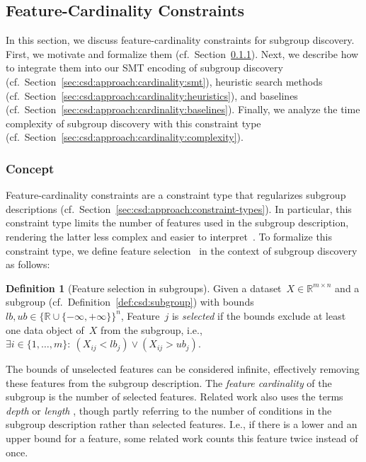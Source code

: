 \documentclass{article}
\theoremstyle{definition}
\newtheorem{definition}{Definition}
\begin{document}
\subsection{Feature-Cardinality Constraints}
\label{sec:csd:approach:cardinality}

In this section, we discuss feature-cardinality constraints for subgroup discovery.
First, we motivate and formalize them (cf.~Section~\ref{sec:csd:approach:cardinality:concept}).
Next, we describe how to integrate them into our SMT encoding of subgroup discovery (cf.~Section~\ref{sec:csd:approach:cardinality:smt}), heuristic search methods (cf.~Section~\ref{sec:csd:approach:cardinality:heuristics}), and baselines (cf.~Section~\ref{sec:csd:approach:cardinality:baselines}).
Finally, we analyze the time complexity of subgroup discovery with this constraint type (cf.~Section~\ref{sec:csd:approach:cardinality:complexity}).

\subsubsection{Concept}
\label{sec:csd:approach:cardinality:concept}

Feature-cardinality constraints are a constraint type that regularizes subgroup descriptions (cf.~Section~\ref{sec:csd:approach:constraint-types}).
In particular, this constraint type limits the number of features used in the subgroup description, rendering the latter less complex and easier to interpret~\cite{meeng2021real}.
To formalize this constraint type, we define feature selection~\cite{guyon2003introduction, li2017feature} in the context of subgroup discovery as follows:
%
\begin{definition}[Feature selection in subgroups]
	Given a dataset~$X \in \mathbb{R}^{m \times n}$ and a subgroup (cf.~Definition~\ref{def:csd:subgroup}) with bounds~$\mathit{lb}, \mathit{ub} \in \{\mathbb{R} \cup \{-\infty, +\infty\}\}^n$,
	Feature~$j$ is \emph{selected} if the bounds exclude at least one data object of~$X$ from the subgroup, i.e., $\exists i \in \{1, \dots, m\}:~ \left( X_{ij} < \mathit{lb}_j \right) \lor \left( X_{ij} > \mathit{ub}_j \right)$.
	\label{def:csd:feature-selection}
\end{definition}
%
The bounds of unselected features can be considered infinite, effectively removing these features from the subgroup description.
The \emph{feature cardinality} of the subgroup is the number of selected features.
Related work also uses the terms \emph{depth} \cite{meeng2021real} or \emph{length} \cite{atzmueller2015subgroup, helal2016subgroup}, though partly referring to the number of conditions in the subgroup description rather than selected features.
I.e., if there is a lower and an upper bound for a feature, some related work counts this feature twice instead of once.
\end{document}
